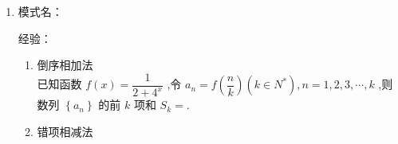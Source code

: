 \begin{enumerate}
\begin{enumerate}
        若数列$\{a_n\}$满足$(n-1)a_n = (n+1)a_{n-1}(n \geq 2), a_1 = 2$，则满足$a_n = $
        \begin{jieda}
            根据递推关系可知$a_n \neq 0$，故$\dfrac{a_n}{a_{n-1}} = \dfrac{n+1}{n-1}$，故累乘得到$a_n = n(n+1)(n \geq 2)$，经检验$a_n = n(n+1)$.
        \end{jieda}
        \item $a_{n+1} = pa_n^k$型 \\
        若数列$\{a_n\}$满足$a_1 = 1, a_{n+1} = 2a_n^2$，则$a_n = $
        \begin{jieda}
            $a_{n+1} = 2a_n^2$即$log_2(a_{n+1}) = 2 \cdot log_2(a_n) + 1$，设$b_n = log_2(a_n)$，则$b_1 = 0, b_{n+1} = 2b_n + 1$，故设$c_n = b_n + 1$，则$c_1 = 1, c_{n+1} = 2c_n$，故$c_n = 2^{n-1}$，故$b_n = 2^{n-1}-1$，因此$a_n = 2^{2^{n-1}-1}$.
        \end{jieda}
    \end{enumerate}

    \item 模式名：
    
    经验：

    
    
    \begin{enumerate}
        \item 倒序相加法 \\
        已知函数 $f\left( x\right)  = \dfrac{1}{2 + {4}^{x}}$ ,令 ${a}_{n} = f\left( \dfrac{n}{k}\right) \left( {k \in  {N}^{ * }}\right) ,n = 1,2,3,\cdots ,k$ ,则数列 $\left\{  {a}_{n}\right\}$ 的前 $k$ 项和 ${S}_{k} =$.
        
        \item 错项相减法 \\
        

\end{enumerate}
\end{enumerate}
